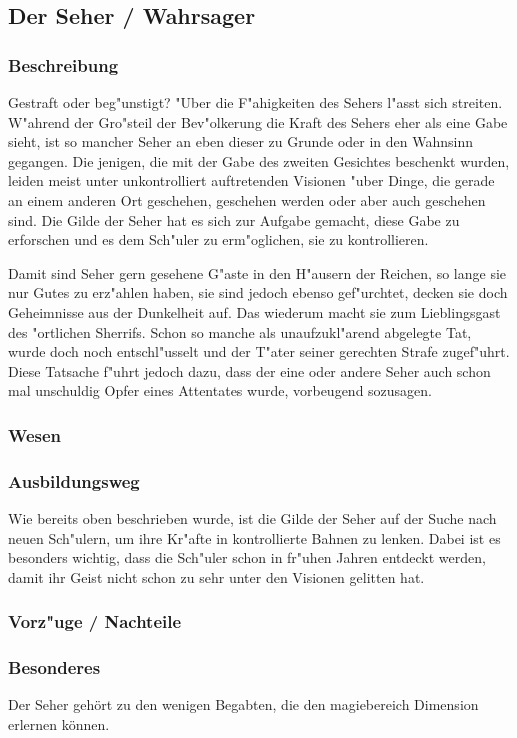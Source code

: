\subsection{Der Seher / Wahrsager}
\subsubsection{Beschreibung}
\par Gestraft oder beg"unstigt? "Uber die F"ahigkeiten des Sehers l"asst sich streiten. W"ahrend der Gro"steil 
der Bev"olkerung die Kraft des Sehers eher als eine Gabe sieht, ist so mancher Seher an eben dieser zu Grunde 
oder in den Wahnsinn gegangen.
Die jenigen, die mit der Gabe des zweiten Gesichtes beschenkt wurden, leiden meist unter unkontrolliert
 auftretenden Visionen "uber Dinge, die gerade an einem anderen Ort geschehen, geschehen werden oder aber 
 auch geschehen sind. Die Gilde der Seher hat es sich zur Aufgabe gemacht, diese Gabe zu erforschen und es 
 dem Sch"uler zu erm"oglichen, sie zu kontrollieren.
\par Damit sind Seher gern gesehene G"aste in den H"ausern der Reichen, so lange sie nur Gutes zu erz"ahlen 
haben, sie sind jedoch ebenso gef"urchtet, decken sie doch Geheimnisse aus der Dunkelheit auf. Das wiederum
 macht sie zum Lieblingsgast des "ortlichen Sherrifs. Schon so manche als unaufzukl"arend abgelegte Tat, 
 wurde doch noch entschl"usselt und der T"ater seiner gerechten Strafe zugef"uhrt. Diese Tatsache f"uhrt 
jedoch dazu, dass der eine oder andere Seher auch schon mal unschuldig Opfer eines Attentates wurde, 
vorbeugend sozusagen.
\subsubsection{Wesen}
\subsubsection{Ausbildungsweg}
\par Wie bereits oben beschrieben wurde, ist die Gilde der Seher auf der Suche nach neuen Sch"ulern, 
um ihre Kr"afte in kontrollierte Bahnen zu lenken. Dabei ist es besonders wichtig, dass die Sch"uler 
schon in fr"uhen Jahren entdeckt werden, damit ihr Geist nicht schon zu sehr unter den Visionen gelitten hat.
\subsubsection{Vorz"uge / Nachteile}
\subsubsection{Besonderes}
\par Der Seher gehört zu den wenigen Begabten, die den magiebereich Dimension erlernen können.
